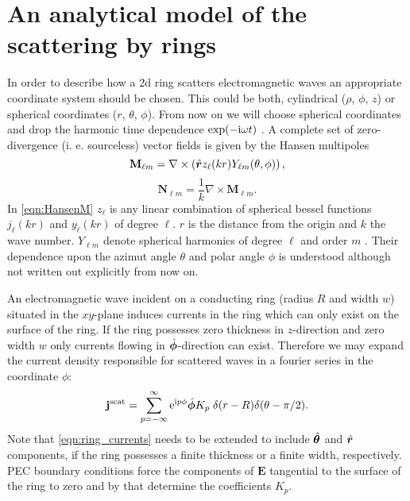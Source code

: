 

\section{An analytical model of the scattering by rings}
\label{sec:analytical_ring_scattering}

In order to describe how a 2d ring scatters electromagnetic waves an appropriate coordinate system should be chosen. This could be both, cylindrical ($\rho$, $\phi$, $z$) or spherical coordinates ($r$, $\theta$, $\phi$). From now on we will choose spherical coordinates and drop the harmonic time dependence $\exp(-\mathrm{i} \omega t)$ . A complete set of zero-divergence (i. e. sourceless) vector fields is given by the Hansen multipoles \Cite{Hansen1935} 
\begin{equation}
\mathbf{M}_{\ell m} = \nabla \times\left( \hat{\bm{r}} z_\ell(kr) Y_{\ell m}(\theta, \phi)\right),
\label{eqn:HansenM}
\end{equation}
\begin{equation}
\mathbf{N}_{\ell m} = \frac{1}{k}\nabla \times \mathbf{M}_{\ell m}.
\label{eqn:HansenN}
\end{equation}
In \cref{eqn:HansenM} $z_\ell$ is any linear combination of spherical bessel functions $j_\ell(kr)$ and $y_\ell(kr)$ \Cite{DLMF_Bessel} of degree $\ell$. $r$ is the distance from the origin and $k$ the wave number. $Y_{\ell m}$ denote spherical harmonics of degree $\ell$ and order $m$ \Cite{DLMF_SphericalHarmonics}. Their dependence upon the azimut angle $\theta$ and polar angle $\phi$ is understood although not written out explicitly from now on.

An electromagnetic wave incident on a conducting ring (radius $R$ and width $w$) situated in the $xy$-plane induces currents in the ring which can only exist on the surface of the ring. If the ring possesses zero thickness in $z$-direction and zero width $w$ only currents flowing in $\hat{\bm{\phi}}$-direction can exist. Therefore we may expand the current density responsible for scattered waves in a fourier series in the coordinate $\phi$:
\begin{equation}
\mathbf{j}^\text{scat} = \sum_{p=-\infty}^\infty \mathrm{e}^{\mathrm{i} p \phi} \hat{\bm{\phi}}K_p\; \delta(r-R) \delta(\theta-\pi/2) .
\label{eqn:ring_currents}
\end{equation}
Note that \cref{eqn:ring_currents} needs to be extended to include $\hat{\bm{\theta}}$ and $\hat{\bm{r}}$ components, if the ring possesses a finite thickness or a finite width, respectively. PEC boundary conditions force the components of $\mathbf{E}$ tangential to the surface of the ring to zero and by that determine the coefficients $K_p$.

